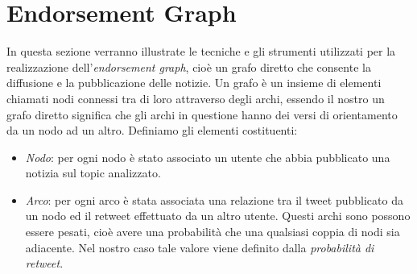 \section{Endorsement Graph}

In questa sezione verranno illustrate le tecniche e gli strumenti utilizzati per la realizzazione dell'\textit{endorsement graph}, cioè un grafo diretto che consente la diffusione e la pubblicazione delle notizie.
Un grafo è un insieme di elementi chiamati nodi connessi tra di loro attraverso degli archi, essendo il nostro un grafo diretto significa che gli archi in questione hanno dei versi di orientamento da un nodo ad un altro.
Definiamo gli elementi costituenti:
\begin{itemize}
\item \textit{Nodo}: per ogni nodo è stato associato un utente che abbia pubblicato una notizia sul topic analizzato.
\item \textit{Arco}: per ogni arco è stata associata una relazione tra il tweet pubblicato da un nodo ed il retweet effettuato da un altro utente. Questi archi sono possono essere pesati, cioè avere una probabilità che una qualsiasi coppia di nodi sia adiacente. Nel nostro caso tale valore viene definito dalla \textit{probabilità di retweet}.
\end{itemize}

